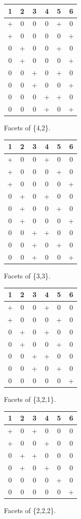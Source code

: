 \documentclass[12pt]{article}
\begin{document}
\begin{itemize}
\begin{figure}[h]
\centering
\begin{tabular}{cccccc}
1 & 2 & 3 & 4 & 5 & 6 \\ \hline
+ & 0 & 0 & 0 & + & 0 \\
+ & 0 & 0 & 0 & 0 & + \\
0 & + & 0 & 0 & + & 0 \\
0 & + & 0 & 0 & 0 & + \\
0 & 0 & + & 0 & + & 0 \\
0 & 0 & + & 0 & 0 & + \\
0 & 0 & 0 & + & + & 0 \\
0 & 0 & 0 & + & 0 & +
\end{tabular}
\caption{Facets of \{4,2\}.}
\end{figure}
\begin{figure}
\centering
\begin{tabular}{cccccc}
1 & 2 & 3 & 4 & 5 & 6 \\ \hline
+ & 0 & 0 & + & 0 & 0 \\
+ & 0 & 0 & 0 & + & 0 \\
+ & 0 & 0 & 0 & 0 & + \\
0 & + & 0 & + & 0 & 0 \\
0 & + & 0 & 0 & + & 0 \\
0 & + & 0 & 0 & 0 & + \\
0 & 0 & + & + & 0 & 0 \\
0 & 0 & + & 0 & + & 0 \\
0 & 0 & + & 0 & 0 & +
\end{tabular}
\caption{Facets of \{3,3\}.}
\end{figure}

\begin{figure}
\centering
\begin{tabular}{cccccc}
1 & 2 & 3 & 4 & 5 & 6 \\ \hline
+ & 0 & 0 & + & 0 & 0 \\
+ & 0 & 0 & 0 & + & 0 \\
0 & + & 0 & + & 0 & 0 \\
0 & + & 0 & 0 & + & 0 \\
0 & 0 & + & + & 0 & 0 \\
0 & 0 & + & 0 & + & 0 \\
0 & 0 & 0 & 0 & 0 & +
\end{tabular}
\caption{Facets of \{3,2,1\}.}
\end{figure}

\begin{figure}
\centering
\begin{tabular}{cccccc}
1 & 2 & 3 & 4 & 5 & 6 \\ \hline
+ & 0 & + & 0 & 0 & 0 \\
+ & 0 & 0 & + & 0 & 0 \\
0 & + & + & 0 & 0 & 0 \\
0 & + & 0 & + & 0 & 0 \\
0 & 0 & 0 & 0 & + & 0 \\
0 & 0 & 0 & 0 & 0 & +
\end{tabular}
\caption{Facets of \{2,2,2\}.}
\end{figure}

\end{itemize}
\end{document}

